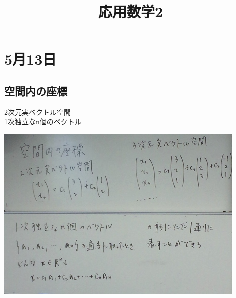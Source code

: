 \documentclass{jsarticle}
\title{応用数学2}
\begin{document}
\section{5月13日}
	\subsection{空間内の座標}
	2次元実ベクトル空間\\
	1次独立なn個のベクトル\\
	\begin{center}
		\includegraphics[width=12cm]{5_13_1.JPG}
	\end{center}
	
\end{document}
